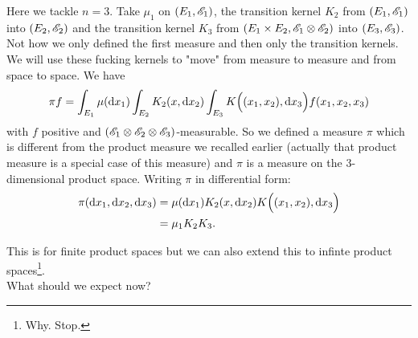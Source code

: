 \documentclass{report}
\begin{document}
\begin{example}
	Here we tackle $n=3$. Take $\mu_1$ on $(E_1,\mathscr{E}_1)$, the transition kernel $K_2$ from $(E_1,\mathscr{E}_1)$ into $(E_2,\mathscr{E}_2)$ and the transition kernel $K_3$ from $(E_1\times E_2,\mathscr{E}_1\otimes\mathscr{E}_2)$ into $(E_3,\mathscr{E}_3)$. Not how we only defined the first measure and then only the transition kernels. We will use these fucking kernels to "move" from measure to measure and from space to space. We have
	\[\pi f=\int_{E_1}\mu(\mathop{}\!\mathrm{d} x_1)\int_{E_2}K_2(x,\mathop{}\!\mathrm{d} x_2)\int_{E_3}K\Big((x_1,x_2),\mathop{}\!\mathrm{d} x_3\Big)f(x_1,x_2,x_3)\]
	with $f$ positive and $(\mathscr{E}_1\otimes\mathscr{E}_2\otimes\mathscr{E}_3)$-measurable. So we defined a measure $\pi$ which is different from the product measure we recalled earlier (actually that product measure is a special case of this measure) and $\pi$ is a measure on the 3-dimensional product space. Writing $\pi$ in differential form:
	\begin{align*}
		\pi(\mathop{}\!\mathrm{d} x_1,\mathop{}\!\mathrm{d} x_2,\mathop{}\!\mathrm{d} x_3)&=\mu(\mathop{}\!\mathrm{d} x_1)K_2(x,\mathop{}\!\mathrm{d} x_2)K\Big((x_1,x_2),\mathop{}\!\mathrm{d} x_3\Big)\\
		&=\mu_1K_2K_3.
	\end{align*}
\end{example}
This is for finite product spaces but we can also extend this to infinte product spaces\footnote{Why. Stop.}.\\
What should we expect now?
\end{document}
